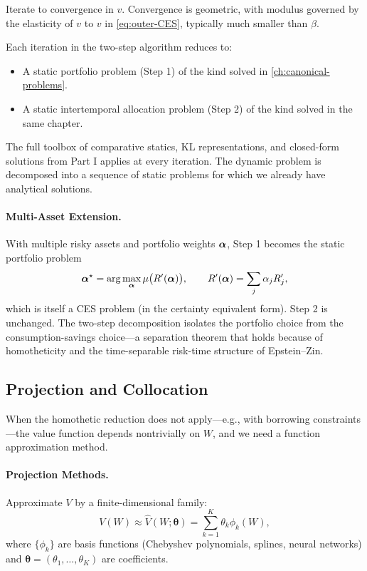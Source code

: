 Iterate to convergence in $v$. Convergence is geometric, with modulus governed by the elasticity of $v$ to $v$ in \cref{eq:outer-CES}, typically much smaller than $\beta$.

\begin{calloutimportant}
Each iteration in the two-step algorithm reduces to:
\begin{itemize}[leftmargin=2em]
    \item A static portfolio problem (Step 1) of the kind solved in \cref{ch:canonical-problems}.
    \item A static intertemporal allocation problem (Step 2) of the kind solved in the same chapter.
\end{itemize}
The full toolbox of comparative statics, KL representations, and closed-form solutions from Part I applies at every iteration. The dynamic problem is decomposed into a sequence of static problems for which we already have analytical solutions.
\end{calloutimportant}

\paragraph{Multi-Asset Extension.}
With multiple risky assets and portfolio weights $\boldsymbol{\alpha}$, Step 1 becomes the static portfolio problem
\begin{equation}
\boldsymbol{\alpha}^\star = \arg\max_{\boldsymbol{\alpha}} \mu\big( R'(\boldsymbol{\alpha}) \big), \qquad R'(\boldsymbol{\alpha}) = \sum_j \alpha_j R_j',
\label{eq:portfolio-step}
\end{equation}
which is itself a CES problem (in the certainty equivalent form). Step 2 is unchanged. The two-step decomposition isolates the portfolio choice from the consumption-savings choice---a separation theorem that holds because of homotheticity and the time-separable risk-time structure of Epstein--Zin.

\subsection{Projection and Collocation}
\label{subsec:dp-projection}

When the homothetic reduction does not apply---e.g., with borrowing constraints---the value function depends nontrivially on $W$, and we need a function approximation method.

\paragraph{Projection Methods.}
Approximate $V$ by a finite-dimensional family:
\begin{equation}
V(W) \approx \hat V(W; \boldsymbol{\theta}) = \sum_{k=1}^{K} \theta_k \phi_k(W),
\label{eq:projection}
\end{equation}
where $\{\phi_k\}$ are basis functions (Chebyshev polynomials, splines, neural networks) and $\boldsymbol\theta = (\theta_1, \ldots, \theta_K)$ are coefficients.

